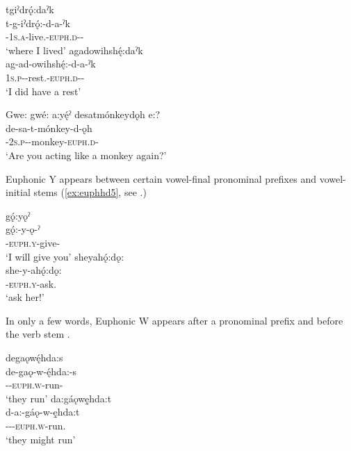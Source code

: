 \ea\label{ex:euphhd3}
\ea tgiˀdrǫ́:daˀk\\
\gll t-g-iˀdrǫ́:-d-a-ˀk\\
 {\cislocative}-\textsc{1s.a}-live.{\stative}-\textsc{euph.d}-{\joinerA}-\\
\glt `where I lived'
\ex agadowihshę́:daˀk\\
\gll ag-ad-owihshę́:-d-a-ˀk\\
 \textsc{1s.p}-{\semireflexive}-rest.{\stative}-\textsc{euph.d}-{\joinerA}- \\
\glt `I did have a rest'
\z
\z

\ea\label{ex:euphhd4}
Gwe: gwé: a:yę́ˀ desatmónkeydǫh e:? \\
\gll de-sa-t-mónkey-d-ǫh\\
{\dualic}-\textsc{2s.p}-{\semireflexive}-monkey-\textsc{euph.d}-\footnotemark{}\\
\glt ‘Are you acting like a monkey again?’
\z

Euphonic Y appears between certain vowel-final pronominal prefixes and vowel-initial stems (\ref{ex:euphhd5}, see .)

\ea\label{ex:euphhd5}
\ea gǫ́:yǫˀ\\
\gll gǫ́:-y-ǫ-ˀ\\
 -\textsc{euph.y}-give-{\punctual}\\
\glt `I will give you'
\ex sheyahǫ́:dǫ:\\
\gll she-y-ahǫ́:dǫ:\\
 -\textsc{euph.y}-ask.{\noaspect}\\
\glt `ask her!'
\z
\z

In only a few words, Euphonic W appears after a pronominal prefix and before the verb stem .

\ea\label{ex:euphhd6} 
\ea degaǫwę́hda:s\\
\gll de-gaǫ-w-ę́hda:-s\\
 {\dualic}--\textsc{euph.w}-run-{\habitual}\\
\glt `they run'
\ex da:gáǫwę̱hda:t\\
\gll d-a:-gáǫ-w-ę̱hda:t\\
 {\dualic}-{\indefinite}--\textsc{euph.w}-run.{\zeropunctual}\\
\glt `they might run'
\z
\z

